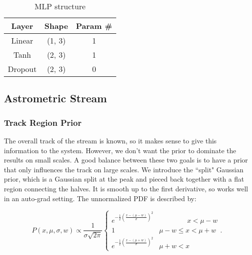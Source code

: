 \documentclass[twocolumn]{aastex631}
\newcommand{\pdf}{P}
\newcommand{\Exp}[1]{e^{#1}}
\begin{document}
        \begin{table}
            \centering
            \caption{MLP structure}
            \begin{tabular}{@{}ccc@{}}
            \toprule
            Layer & Shape & Param \# \\
            \midrule
            Linear & (1, 3) & 1  \\
            Tanh & (2, 3) & 1  \\
            Dropout & (2, 3) & 0  \\
            \bottomrule
            \end{tabular}
        \end{table}

        

    \subsection{Astrometric Stream}

        \subsubsection{Track Region Prior} \label{sub:track_region_prior}

            The overall track of the stream is known, so it makes sense to give this information to the system. However, we don't want the prior to dominate the results on small scales. A good balance between these two goals is to have a prior that only influences the track on large scales.
            We introduce the ``split" Gaussian prior, which is a Gaussian split at the peak and pieced back together with a flat region connecting the halves. 
            It is smooth up to the first derivative, so works well in an auto-grad setting.
            The unnormalized PDF is described by:
            \begin{small}
            \begin{equation}
                \pdf(x,\mu,\sigma,w) \propto  \frac{1}{\sigma \sqrt{2 \pi}} \begin{cases} 
                   \Exp{-\frac{1}{2}\left(\frac{x-(\mu-w)}{\sigma}\right)^2} & \phantom{\mu - w <}\ x < \mu - w \\
                    1 & \mu - w \leq x < \mu + w \\
                    \Exp{-\frac{1}{2}\left(\frac{x-(\mu+w)}{\sigma}\right)^2} & \mu + w < x
                \end{cases}.
            \end{equation}\end{small}
    
\end{document}

